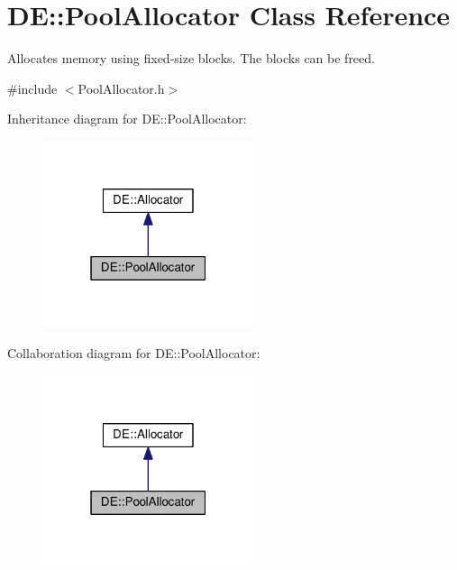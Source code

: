 \hypertarget{classDE_1_1PoolAllocator}{}\section{DE\+:\+:Pool\+Allocator Class Reference}
\label{classDE_1_1PoolAllocator}


Allocates memory using fixed-\/size blocks. The blocks can be freed.  




{\ttfamily \#include $<$Pool\+Allocator.\+h$>$}



Inheritance diagram for DE\+:\+:Pool\+Allocator\+:\nopagebreak
\begin{figure}[H]
\begin{center}
\leavevmode
\includegraphics[width=175pt]{classDE_1_1PoolAllocator__inherit__graph}
\end{center}
\end{figure}


Collaboration diagram for DE\+:\+:Pool\+Allocator\+:\nopagebreak
\begin{figure}[H]
\begin{center}
\leavevmode
\includegraphics[width=175pt]{classDE_1_1PoolAllocator__coll__graph}
\end{center}
\end{figure}
